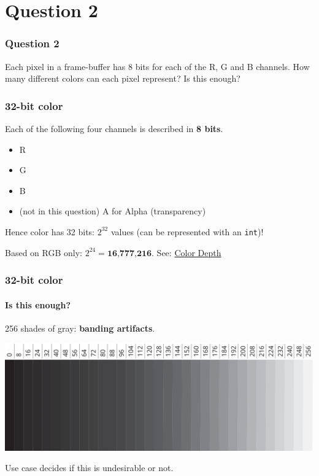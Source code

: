 \documentclass{beamer}
\begin{document}
\section{Question 2}

\begin{frame}
    \frametitle{Question 2}

    Each pixel in a frame-buffer has 8 bits for each of the R, G and B channels. How many different
    colors can each pixel represent? Is this enough?

\end{frame}

\begin{frame}
    \frametitle{32-bit color}

    Each of the following four channels is described in \textbf{8 bits}.
    \begin{itemize}
        \item R
        \item G
        \item B
        \item (not in this question) A for Alpha (transparency)
    \end{itemize}

    Hence color has 32 bits: $2^32$ values (can be represented with an \texttt{int})!

    Based on RGB only: $2^{24} = \textbf{16,777,216}$. 
    See: \hyperlink{https://computer.howstuffworks.com/monitor4.htm}{Color Depth}

\end{frame}

\begin{frame}
    \frametitle{32-bit color}
    \framesubtitle{Is this enough?}

    256 shades of gray: \textbf{banding artifacts}.

    \begin{center}
        \includegraphics[scale=0.25]{greyscale-levels.png}
    \end{center}

    Use case decides if this is undesirable or not.

\end{frame}
\end{document}
